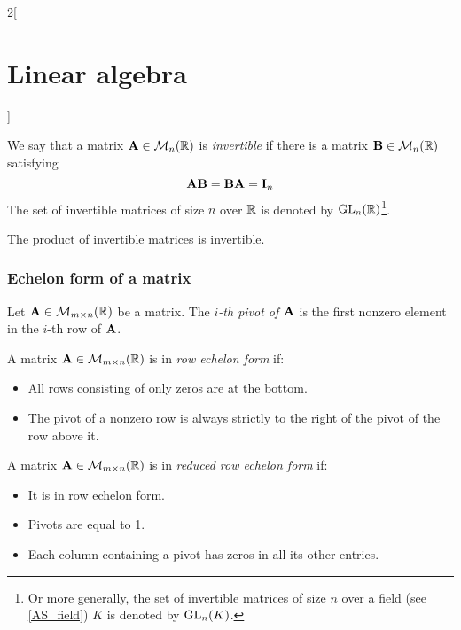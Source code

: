 \documentclass[../../../main.tex]{subfiles}
\begin{document}
\begin{multicols}{2}[\section{Linear algebra}]
  \begin{definition}
    We say that a matrix $\boldsymbol{\mathrm{A}}\in\mathcal{M}_n(\mathbb{R})$ is \textit{invertible} if there is a matrix $\boldsymbol{\mathrm{B}}\in\mathcal{M}_n(\mathbb{R})$ satisfying $$\boldsymbol{\mathrm{A}}\boldsymbol{\mathrm{B}}=\boldsymbol{\mathrm{B}}\boldsymbol{\mathrm{A}}=\boldsymbol{\mathrm{I}}_n$$
    The set of invertible matrices of size $n$ over $\mathbb{R}$ is denoted by $\mathrm{GL}_n(\mathbb{R})$\footnote{Or more generally, the set of invertible matrices of size $n$ over a field (see \cref{AS_field}) $K$ is denoted by $\mathrm{GL}_n(K)$.}.
  \end{definition}
  \begin{lemma}
    The product of invertible matrices is invertible.
  \end{lemma}
  \subsubsection{Echelon form of a matrix}
  \begin{definition}
    Let $\boldsymbol{\mathrm{A}}\in\mathcal{M}_{m\times n}(\mathbb{R})$ be a matrix. The \textit{$i$-th pivot of $\boldsymbol{\mathrm{A}}$} is the first nonzero element in the $i$-th row of $\boldsymbol{\mathrm{A}}$.
  \end{definition}
  \begin{definition}
    A matrix $\boldsymbol{\mathrm{A}}\in\mathcal{M}_{m\times n}(\mathbb{R})$ is in \textit{row echelon form} if:
    \begin{itemize}
      \item All rows consisting of only zeros are at the bottom.
      \item The pivot of a nonzero row is always strictly to the right of the pivot of the row above it.
    \end{itemize}
  \end{definition}
  \begin{definition}
    A matrix $\boldsymbol{\mathrm{A}}\in\mathcal{M}_{m\times n}(\mathbb{R})$ is in \textit{reduced row echelon form} if:
    \begin{itemize}
      \item It is in row echelon form.
      \item Pivots are equal to 1.
      \item Each column containing a pivot has zeros in all its other entries.
    \end{itemize}
  \end{definition}
  \begin{theorem}

\end{theorem}
\end{multicols}
\end{document}
